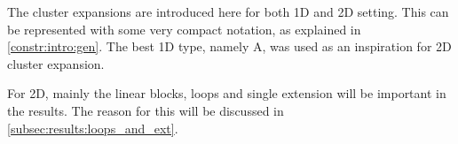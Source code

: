 The cluster expansions are introduced here for both 1D and 2D setting. This can be represented with some very compact notation, as explained in \cref{constr:intro:gen}. The best 1D type, namely A, was used as an inspiration for 2D cluster expansion.

For 2D, mainly the linear blocks, loops and single extension will be important in the results. The reason for this will be discussed in \cref{subsec:results:loops_and_ext}.